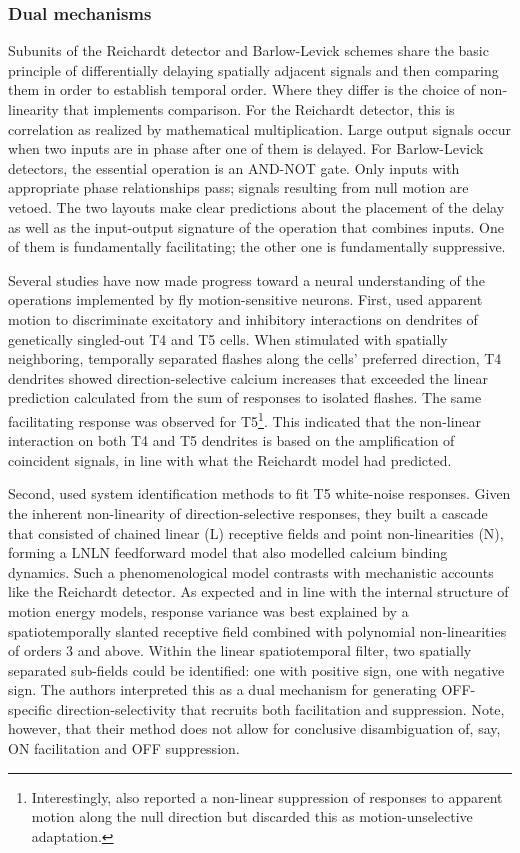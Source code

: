 \subsubsection{Dual mechanisms}
Subunits of the Reichardt detector and Barlow-Levick schemes share the basic principle of differentially delaying spatially adjacent signals and then comparing them in order to establish temporal order. Where they differ is the choice of non-linearity that implements comparison. For the Reichardt detector, this is correlation as realized by mathematical multiplication. Large output signals occur when two inputs are in phase after one of them is delayed. For Barlow-Levick detectors, the essential operation is an AND-NOT gate. Only inputs with appropriate phase relationships pass; signals resulting from null motion are vetoed. The two layouts make clear predictions about the placement of the delay as well as the input-output signature of the operation that combines inputs. One of them is fundamentally facilitating; the other one is fundamentally suppressive.

Several studies have now made progress toward a neural understanding of the operations implemented by fly motion-sensitive neurons. First, \citet{Fisher:2015jo} used apparent motion to discriminate excitatory and inhibitory interactions on dendrites of genetically singled-out T4 and T5 cells. When stimulated with spatially neighboring, temporally separated flashes along the cells' preferred direction, T4 dendrites showed direction-selective calcium increases that exceeded the linear prediction calculated from the sum of responses to isolated flashes. The same facilitating response was observed for T5\footnote{Interestingly, \citet{Fisher:2015jo} also reported a non-linear suppression of responses to apparent motion along the null direction but discarded this as motion-unselective adaptation.}. This indicated that the non-linear interaction on both T4 and T5 dendrites is based on the amplification of coincident signals, in line with what the Reichardt model had predicted.

Second, \citet{Leong:2016hu} used system identification methods to fit T5 white-noise responses. Given the inherent non-linearity of direction-selective responses, they built a cascade that consisted of chained linear (L) receptive fields and point non-linearities (N), forming a LNLN feedforward model that also modelled calcium binding dynamics. Such a phenomenological model contrasts with mechanistic accounts like the Reichardt detector. As expected and in line with the internal structure of motion energy models, response variance was best explained by a spatiotemporally slanted receptive field combined with polynomial non-linearities of orders 3 and above. Within the linear spatiotemporal filter, two spatially separated sub-fields could be identified: one with positive sign, one with negative sign. The authors interpreted this as a dual mechanism for generating OFF-specific direction-selectivity that recruits both facilitation and suppression. Note, however, that their method does not allow for conclusive disambiguation of, say, ON facilitation and OFF suppression.

